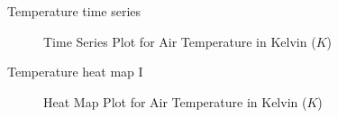 \documentclass[
    hyperref={
        final,
        colorlinks=true,
        menucolor=black,
        anchorcolor=green,
        linkcolor=blue,
        citecolor=red,
        pdftitle={RS RAS Internship Presentation},
        pdfauthor={Moritz M. Konarski}
    }
]{beamer}
\begin{document}
\begin{frame}{Temperature time series}
\begin{figure}
    \vspace{-6pt}
    \caption{Time Series Plot for Air Temperature in Kelvin ($K$)}
\end{figure}
\end{frame}

\begin{frame}{Temperature heat map I}
\begin{figure}
    \vspace{-6pt}
    \caption{Heat Map Plot for Air Temperature in Kelvin ($K$)}
\end{figure}
\end{frame}
\end{document}

